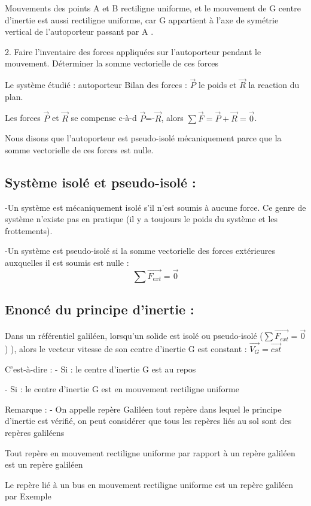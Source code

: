 \documentclass[12pt]{article}
\begin{document}
Mouvements des points A et B rectiligne uniforme, et le mouvement de G centre
d’inertie est aussi rectiligne uniforme, car G appartient à l'axe de symétrie
vertical de l’autoporteur passant par A .

2. Faire l’inventaire des forces appliquées sur l’autoporteur pendant le mouvement. Déterminer la somme
vectorielle de ces forces

Le système étudié : {autoporteur}
Bilan des forces : $\vec{P}$ le poids et $\vec{R}$ la reaction du plan.

Les forces $\vec{P}$ et $\vec{R}$ se compense c-à-d $\vec{P} $=-$  \vec{R}$, alors $\sum \vec{F} = \vec{P} + \vec{R} = \vec{0} $.
 
Nous disons que l’autoporteur est pseudo-isolé mécaniquement parce que la
somme vectorielle de ces forces est nulle.

\subsection{ Système isolé et pseudo-isolé :  }
-Un système est mécaniquement isolé s'il n'est soumis à aucune force. Ce genre de système n'existe pas en pratique (il y a toujours le poids du système et les frottements).

-Un système est pseudo-isolé si la somme vectorielle des forces extérieures auxquelles il est soumis est nulle :
$$\sum \overrightarrow{F_{ext}} = \vec{0}$$

\subsection{Enoncé du principe d’inertie : }

Dans un référentiel galiléen, lorsqu’un solide est isolé ou pseudo-isolé ($\sum \overrightarrow{F_{ext}} = \vec{0}$) ), alors le vecteur vitesse de
son centre d'inertie G est constant : $\overrightarrow{V_G} = \overrightarrow{cst}$

C'est-à-dire :
- Si : le centre d'inertie G est au repos

- Si : le centre d'inertie G est en mouvement rectiligne uniforme

Remarque :
- On appelle repère Galiléen tout repère dans lequel le principe d’inertie est vérifié, on peut considérer que tous les repères liés au sol sont des repères galiléens 

Tout repère en mouvement rectiligne uniforme par rapport à un repère galiléen est un repère galiléen

Le repère lié à un bus en mouvement rectiligne uniforme est un repère
galiléen par Exemple
\end{document}
